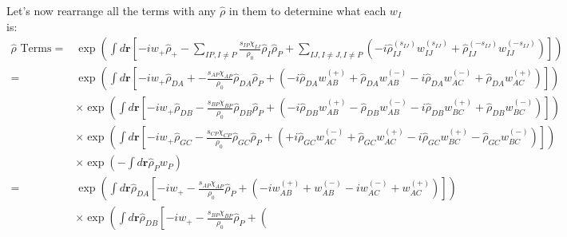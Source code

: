 \documentclass{article}
\begin{document}
Let's now rearrange all the terms with any $\hat{\rho}$ in them to determine
  what each $w_I$ is:
\begin{align*}
  \hat{\rho}\textrm{ Terms} =
    &\exp \left(
      \int d \mathbf{r} \left[
        - i w_+ \hat{\rho}_+
        -
        \sum_{IP,I \ne P}
        \frac{s_{IP}\chi_{IJ}}{\rho_0}
        \hat{\rho}_I \hat{\rho}_P
        +
        \sum_{IJ, I \ne J, I \ne P}
        \left(
          -i \hat{\rho}_{IJ}^{(s_{IJ})} w_{IJ}^{(s_{IJ})}
          + \hat{\rho}_{IJ}^{(-s_{IJ})} w_{IJ}^{(-s_{IJ})}
        \right)
      \right]
    \right) \\
  =
    &\exp \left(
      \int d \mathbf{r} \left[
        - i w_+ \hat{\rho}_{DA}
        +
        - \frac{s_{AP}\chi_{AP}}{\rho_0}
        \hat{\rho}_{DA} \hat{\rho}_P
        +
        \left(
          -i \hat{\rho}_{DA} w_{AB}^{(+)} + \hat{\rho}_{DA} w_{AB}^{(-)}
          -i \hat{\rho}_{DA} w_{AC}^{(-)} + \hat{\rho}_{DA} w_{AC}^{(+)}
        \right)
      \right]
    \right) \\
    &\times
    \exp \left(
      \int d \mathbf{r} \left[
        - i w_+ \hat{\rho}_{DB}
        -
        \frac{s_{BP}\chi_{BP}}{\rho_0}
        \hat{\rho}_{DB} \hat{\rho}_P
        +
        \left(
          -i \hat{\rho}_{DB} w_{AB}^{(+)} - \hat{\rho}_{DB} w_{AB}^{(-)}
          -i \hat{\rho}_{DB} w_{BC}^{(+)} + \hat{\rho}_{DB} w_{BC}^{(-)}
        \right)
      \right]
    \right) \\
    &\times
    \exp \left(
      \int d \mathbf{r} \left[
        - i w_+ \hat{\rho}_{GC}
        -
        \frac{s_{CP}\chi_{CP}}{\rho_0}
        \hat{\rho}_{GC} \hat{\rho}_P
        +
        \left(
          +i \hat{\rho}_{GC} w_{AC}^{(-)} + \hat{\rho}_{GC} w_{AC}^{(+)}
          -i \hat{\rho}_{GC} w_{BC}^{(+)} - \hat{\rho}_{GC} w_{BC}^{(-)}
        \right)
      \right]
    \right) \\
    &\times
      \exp\left(
        - \int d \mathbf{r} \hat{\rho}_{P} w_P %
      \right)
      \\
  =
    &\exp \left(
      \int d \mathbf{r} \hat{\rho}_{DA} \left[
        - i w_+ 
        -
        \frac{s_{AP}\chi_{AP}}{\rho_0}
        \hat{\rho}_P
        +
        \left(
          -i w_{AB}^{(+)} + w_{AB}^{(-)}
          -i w_{AC}^{(-)} + w_{AC}^{(+)}
        \right)
      \right]
    \right) \\
    &\times
    \exp \left(
      \int d \mathbf{r} \hat{\rho}_{DB} \left[
        - i w_+
        -
        \frac{s_{BP}\chi_{BP}}{\rho_0}
        \hat{\rho}_P
        +
        \left(

\end{align*}
\end{document}
